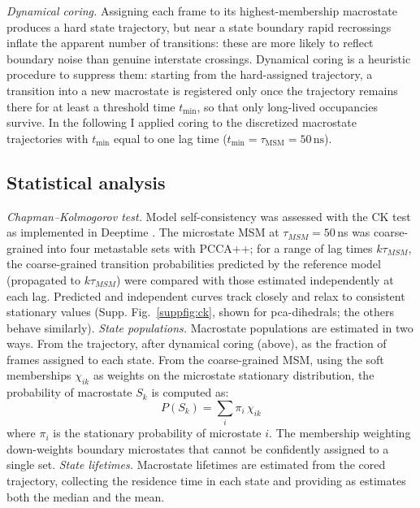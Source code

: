 \documentclass[prl,twocolumn]{revtex4-1}
\begin{document}
\smallskip \newline \textit{Dynamical coring.}
Assigning each frame to its highest-membership macrostate produces a hard state trajectory, but near a state boundary rapid recrossings inflate the apparent number of transitions: these are more likely to reflect boundary noise than genuine interstate crossings. Dynamical coring \cite{dynamical_coring} is a heuristic procedure to suppress them: starting from the hard-assigned trajectory, a transition into a new macrostate is registered only once the trajectory remains there for at least a threshold time $t_{\min}$, so that only long-lived occupancies survive. In the following I applied coring to the discretized macrostate trajectories with $t_{\min}$ equal to one lag time ($t_{\min} = \tau_{\mathrm{MSM}} = 50\,\mathrm{ns}$).
%
%
%
\subsection{Statistical analysis}
\label{sec:methods_statistical_analysis}
\noindent\textit{Chapman--Kolmogorov test.}
Model self-consistency was assessed with the CK test as implemented in Deeptime \cite{deeptime}. The microstate MSM at $\tau_{MSM} = 50$\,ns was coarse-grained into four metastable sets with PCCA++; for a range of lag times $k\tau_{MSM}$, the coarse-grained transition probabilities predicted by the reference model (propagated to $k\tau_{MSM}$) were compared with those estimated independently at each lag. Predicted and independent curves track closely and relax to consistent stationary values (Supp. Fig.~\ref{suppfig:ck}, shown for pca-dihedrals; the others behave similarly).
\smallskip \newline\textit{State populations.}
Macrostate populations are estimated in two ways. From the trajectory, after dynamical coring (above), as the fraction of frames assigned to each state. From the coarse-grained MSM, using the soft memberships $\chi_{ik}$ as weights on the microstate stationary distribution, the probability of macrostate $S_k$ is computed as:
\begin{equation}
    P(S_k) = \sum_i \pi_i\,\chi_{ik}
\label{eq:fuzzy_assignments}
\end{equation}
where $\pi_i$ is the stationary probability of microstate $i$. The membership weighting down-weights boundary microstates that cannot be confidently assigned to a single set.
\smallskip\newline\textit{State lifetimes.}
Macrostate lifetimes are estimated from the cored trajectory, collecting the residence time in each state and providing as estimates both the median and the mean. %
%
%
\end{document}

